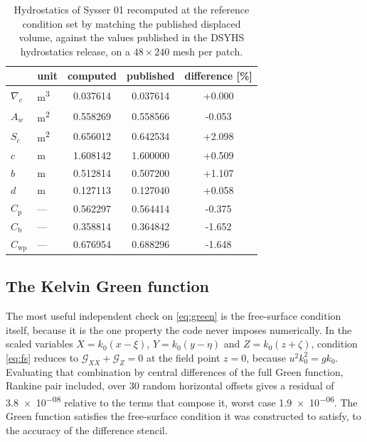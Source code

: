 \documentclass[11pt]{article}
\begin{document}
\begin{table}[htbp]
\centering
\caption{Hydrostatics of Sysser 01 recomputed at the reference condition set by matching
the published displaced volume, against the values published in the DSYHS hydrostatics
release, on a $48\times240$ mesh per patch.}
\label{tab:hydro}
\small
\begin{tabular}{@{}llS[table-format=1.6]S[table-format=1.6]S[table-format=+1.3]@{}}
\toprule
& unit & {computed} & {published} & {difference [\si{\percent}]} \\
\midrule
$\nabla_c$ & \si{\metre\cubed} & 0.037614 & 0.037614 & +0.000 \\
$A_w$ & \si{\metre\squared} & 0.558269 & 0.558566 & -0.053 \\
$S_c$ & \si{\metre\squared} & 0.656012 & 0.642534 & +2.098 \\
$c$ & \si{\metre} & 1.608142 & 1.600000 & +0.509 \\
$b$ & \si{\metre} & 0.512814 & 0.507200 & +1.107 \\
$d$ & \si{\metre} & 0.127113 & 0.127040 & +0.058 \\
$C_\mathrm{p}$ & --- & 0.562297 & 0.564414 & -0.375 \\
$C_\mathrm{b}$ & --- & 0.358814 & 0.364842 & -1.652 \\
$C_\mathrm{wp}$ & --- & 0.676954 & 0.688296 & -1.648 \\
\bottomrule
\end{tabular}
\end{table}

\subsection{The Kelvin Green function}

The most useful independent check on \eqref{eq:green} is the free-surface condition itself,
because it is the one property the code never imposes numerically. In the scaled variables
$X = k_0(x-\xi)$, $Y = k_0(y-\eta)$ and $Z = k_0(z+\zeta)$, condition \eqref{eq:fs} reduces
to $\mathcal{G}_{XX} + \mathcal{G}_Z = 0$ at the field point $z=0$, because
$u^2k_0^2 = gk_0$. Evaluating that combination by central differences of the full Green
function, Rankine pair included, over 30 random horizontal offsets gives a residual of
\num{3.8e-08} relative to the terms that compose it, worst case \num{1.9e-06}. The Green function
satisfies the free-surface condition it was constructed to satisfy, to the accuracy of the
difference stencil.
\end{document}
